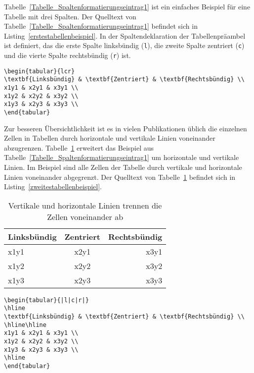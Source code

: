 Tabelle~\ref{Tabelle_Spaltenformatierungseintrag1} ist ein einfaches Beispiel 
für eine Tabelle mit drei Spalten. Der Quelltext von Tabelle~\ref{Tabelle_Spaltenformatierungseintrag1} befindet sich in Listing~\ref{erstestabellenbeispiel}. In der Spaltendeklaration der Tabellenpräambel
ist definiert, das die erste Spalte linksbündig (\verb!l!), die zweite Spalte zentriert (\verb!c!) und die vierte Spalte rechtsbündig (\verb!r!) ist.

\begin{lstlisting}[caption={Eine einfache Tabelle},label=erstestabellenbeispiel, style=customlatex]
\begin{tabular}{lcr}
\textbf{Linksbündig} & \textbf{Zentriert} & \textbf{Rechtsbündig} \\
x1y1 & x2y1 & x3y1 \\
x1y2 & x2y2 & x3y2 \\
x1y3 & x2y3 & x3y3 \\
\end{tabular}
\end{lstlisting}

Zur besseren Übersichtlichkeit ist es in vielen Publikationen üblich die einzelnen Zellen in Tabellen durch horizontale und vertikale Linien voneinander abzugrenzen. 
Tabelle~\ref{Tabelle_Spaltenformatierungseintrag2} erweitert das Beispiel aus Tabelle~\ref{Tabelle_Spaltenformatierungseintrag1} um horizontale und vertikale Linien. Im Beispiel sind alle Zellen der Tabelle durch vertikale und horizontale Linien voneinander abgegrenzt.
Der Quelltext von Tabelle~\ref{Tabelle_Spaltenformatierungseintrag2} befindet sich in Listing~\ref{zweitestabellenbeispiel}. 


\begin{table}[h!tb]
\centering
\caption{Vertikale und horizontale Linien trennen die Zellen voneinander ab}
\label{Tabelle_Spaltenformatierungseintrag2}
\begin{tabular}{|l|c|r|}
\hline
\textbf{Linksbündig} & \textbf{Zentriert} & \textbf{Rechtsbündig} \\
\hline\hline
x1y1 & x2y1 & x3y1 \\
x1y2 & x2y2 & x3y2 \\
x1y3 & x2y3 & x3y3 \\
\hline
\end{tabular}
\end{table}



\begin{lstlisting}[caption={Vertikale und horizontale Linien grenzen die Zellen voneinander ab},label=zweitestabellenbeispiel, style=customlatex]
\begin{tabular}{|l|c|r|}
\hline
\textbf{Linksbündig} & \textbf{Zentriert} & \textbf{Rechtsbündig} \\
\hline\hline
x1y1 & x2y1 & x3y1 \\
x1y2 & x2y2 & x3y2 \\
x1y3 & x2y3 & x3y3 \\
\hline
\end{tabular}
\end{lstlisting}

